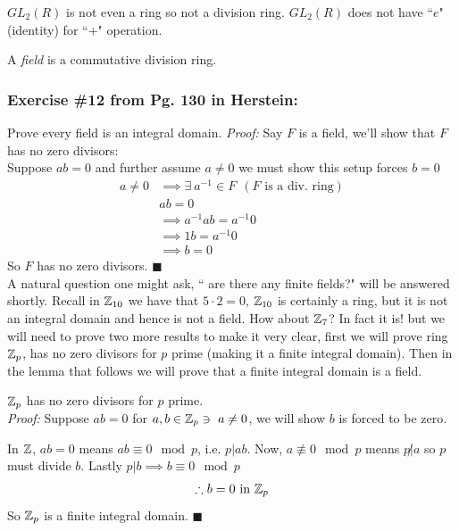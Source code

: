 \begin{example}
    $GL_2(R)$ is not even a ring so not a division ring. $GL_2(R)$ does not have ``$e$" (identity) for ``$+$" operation.
\end{example}

\begin{definition}[Field] 
A \textit{field} is a commutative division ring.
\end{definition}

\subsubsection*{Exercise \#12 from Pg. 130 in Herstein:}
Prove every field is an integral domain.
\textit{Proof:} Say $F$ is a field, we'll show that $F$ has no zero divisors: \steezybreak\\
Suppose $ab=0$ and further assume $a\neq 0$ we must show this setup forces $b=0$
\begin{align}
    a\neq 0 &\implies \exists \ a^{-1}\in F \ \ (F\text{ is a div. ring}) \nonumber \\
    &ab=0 \nonumber \\
    &\implies a^{-1}ab =a^{-1}0 \nonumber \\
    &\implies 1b = a^{-1}0 \nonumber \\
    &\implies b=0 \nonumber
\end{align}
So $F$ has no zero divisors. $\blacksquare$ \steezybreak\\

A natural question one might ask, `` are there any finite fields?" will be answered shortly. Recall in ${\mathbb{ Z}}_{10}$ we have that $5\cdot 2 = 0$, ${\mathbb{ Z}}_{10}$ is certainly a ring, but it is not an integral domain and hence is not a field. How about ${\mathbb{ Z}}_{7}$? In fact it is! but we will need to prove two more results to make it very clear, first we will prove ring ${\mathbb{ Z}}_p$, has no zero divisors for $p$ prime (making it a finite integral domain). Then in the lemma that follows we will prove that a finite integral domain is a field.

\begin{proposition} 
${\mathbb{ Z}}_p$ has no zero divisors for $p$ prime. \steezybreak\\
\textit{Proof:} Suppose $ab=0$ for $a,b \in {\mathbb{ Z}}_p \ni \ a\neq 0$, we will show $b$ is forced to be zero. 

\noindent In ${\mathbb{ Z}}$, $ab=0$ means $ab\equiv 0 \mod p$, i.e. $p|ab$. Now, $a\not\equiv 0 \mod p$ means $p\not | a$ so $p$ must divide $b$. Lastly $p|b \implies b\equiv 0 \mod p$
\begin{align}
    \therefore b=0 \text{ in } {\mathbb{ Z}}_p \nonumber
\end{align}
So ${\mathbb{ Z}}_p$ is a finite integral domain. $\blacksquare$
\end{proposition}

